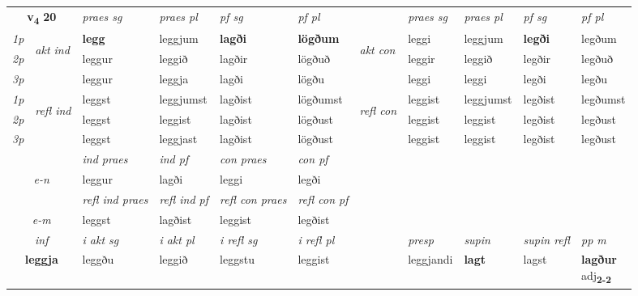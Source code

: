 \noindent
\begin{tabular}{lllllllllll} \toprule
\multicolumn{2}{c}{\textbf{v{\textsubscript{4}}} \Large{\textbf{20}}}  &  \textit{praes sg}  & \textit{praes pl}  &\textit{ pf sg} & \textit{pf pl} &  &  \textit{praes sg}  & \textit{praes pl}  & \textit{pf sg} & \textit{pf pl } \\*
	\cmidrule{3-6} \cmidrule{8-11}
 {\textit{1p}} & \multirow{3}{*}{\begin{turn}{90}\textit{akt ind}\end{turn}} & \textbf{legg} & leggjum & \textbf{lagði} & \textbf{lögðum} & \multirow{3}{*}{\begin{turn}{90}\textit{akt con}\end{turn}} &leggi & leggjum & \textbf{legði} & legðum\\*
 {\textit{2p}} &  &  leggur  & leggið & lagðir & lögðuð & & leggir & leggið & legðir & legðuð \\*
{\textit{3p}} &  & leggur & leggja & lagði & lögðu & & leggi & leggi& legði & legðu \\*
\cmidrule{3-6} \cmidrule{8-11}
 {\textit{1p}} & \multirow{3}{*}{\begin{turn}{90}\textit{refl ind}\end{turn}}  & leggst & leggjumst & lagðist & lögðumst & \multirow{3}{*}{\begin{turn}{90}\textit{refl con}\end{turn}}  &leggist & leggjumst & legðist & legðumst \\*
 {\textit{2p}} &  & leggst & leggist & lagðist & lögðust & &leggist & leggist & legðist & legðust \\*
 {\textit{3p}}  & & leggst & leggjast & lagðist & lögðust & & leggist & leggist& legðist & legðust \\*
\cmidrule{3-6} \cmidrule{8-11}

   & &  \textit{ind praes} & \textit{ind pf} & \textit{con praes} & \textit{con pf} \\*
\multicolumn{2}{c}{ \textit{e-n} } & leggur & lagði & leggi & legði \\*

\cmidrule{3-6}
 & & \textit{refl ind praes} & \textit{refl ind pf} & \textit{refl con praes} & \textit{refl con pf} \\*
 \multicolumn{2}{c}{ \textit{e-m} }& leggst & lagðist & leggist & legðist \\*

\cmidrule{3-11}
   \multicolumn{2}{c}{\textit{inf}}  & \textit{i akt sg} & \textit{i akt pl} & \textit{i refl sg} & \textit{i refl pl} && \textit{presp} & \textit{supin} & \textit{supin refl} & \textit{pp m} \\*
  \multicolumn{2}{c}{\textbf{leggja}} & leggðu  & leggið & leggstu & leggist && leggjandi &  \textbf{lagt} & lagst & \specialcell{\textbf{lagður} \\ adj\textbf{\textsubscript{2-2}}} \\*
\end{tabular}

